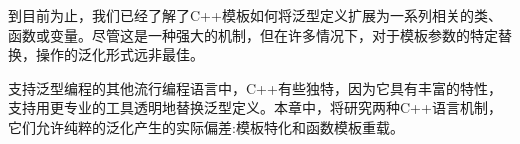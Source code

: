 到目前为止，我们已经了解了C++模板如何将泛型定义扩展为一系列相关的类、函数或变量。尽管这是一种强大的机制，但在许多情况下，对于模板参数的特定替换，操作的泛化形式远非最佳。

支持泛型编程的其他流行编程语言中，C++有些独特，因为它具有丰富的特性，支持用更专业的工具透明地替换泛型定义。本章中，将研究两种C++语言机制，它们允许纯粹的泛化产生的实际偏差:模板特化和函数模板重载。